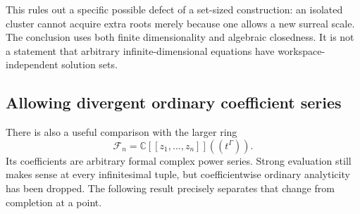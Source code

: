 \documentclass[11pt,letterpaper]{article}
\theoremstyle{definition}
\theoremstyle{remark}
\newcommand{\C}{\mathbb C}
\numberwithin{equation}{section}
\begin{document}
This rules out a specific possible defect of a set-sized construction: an isolated cluster cannot acquire extra roots merely because one allows a new surreal scale. The conclusion uses both finite dimensionality and algebraic closedness. It is not a statement that arbitrary infinite-dimensional equations have workspace-independent solution sets.

\subsection{Allowing divergent ordinary coefficient series}
There is also a useful comparison with the larger ring
\[
 \mathscr F_n=\C[[z_1,\ldots,z_n]]((t^\Gamma)).
\]
Its coefficients are arbitrary formal complex power series. Strong evaluation still makes sense at every infinitesimal tuple, but coefficientwise ordinary analyticity has been dropped. The following result precisely separates that change from completion at a point.
\end{document}
